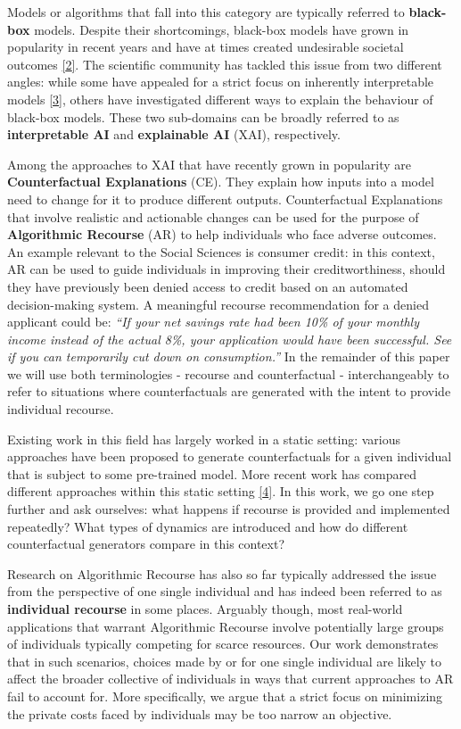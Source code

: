\documentclass[
  conference]{IEEEtran}
\begin{document}
Models or algorithms that fall into this category are typically referred
to \textbf{black-box} models. Despite their shortcomings, black-box
models have grown in popularity in recent years and have at times
created undesirable societal outcomes
\protect\hyperlink{ref-o2016weapons}{{[}2{]}}. The scientific community
has tackled this issue from two different angles: while some have
appealed for a strict focus on inherently interpretable models
\protect\hyperlink{ref-rudin2019stop}{{[}3{]}}, others have investigated
different ways to explain the behaviour of black-box models. These two
sub-domains can be broadly referred to as \textbf{interpretable AI} and
\textbf{explainable AI} (XAI), respectively.

Among the approaches to XAI that have recently grown in popularity are
\textbf{Counterfactual Explanations} (CE). They explain how inputs into
a model need to change for it to produce different outputs.
Counterfactual Explanations that involve realistic and actionable
changes can be used for the purpose of \textbf{Algorithmic Recourse}
(AR) to help individuals who face adverse outcomes. An example relevant
to the Social Sciences is consumer credit: in this context, AR can be
used to guide individuals in improving their creditworthiness, should
they have previously been denied access to credit based on an automated
decision-making system. A meaningful recourse recommendation for a
denied applicant could be: \emph{``If your net savings rate had been
10\% of your monthly income instead of the actual 8\%, your application
would have been successful. See if you can temporarily cut down on
consumption.''} In the remainder of this paper we will use both
terminologies - recourse and counterfactual - interchangeably to refer
to situations where counterfactuals are generated with the intent to
provide individual recourse.

Existing work in this field has largely worked in a static setting:
various approaches have been proposed to generate counterfactuals for a
given individual that is subject to some pre-trained model. More recent
work has compared different approaches within this static setting
\protect\hyperlink{ref-pawelczyk2021carla}{{[}4{]}}. In this work, we go
one step further and ask ourselves: what happens if recourse is provided
and implemented repeatedly? What types of dynamics are introduced and
how do different counterfactual generators compare in this context?

Research on Algorithmic Recourse has also so far typically addressed the
issue from the perspective of one single individual and has indeed been
referred to as \textbf{individual recourse} in some places. Arguably
though, most real-world applications that warrant Algorithmic Recourse
involve potentially large groups of individuals typically competing for
scarce resources. Our work demonstrates that in such scenarios, choices
made by or for one single individual are likely to affect the broader
collective of individuals in ways that current approaches to AR fail to
account for. More specifically, we argue that a strict focus on
minimizing the private costs faced by individuals may be too narrow an
objective.
\end{document}
